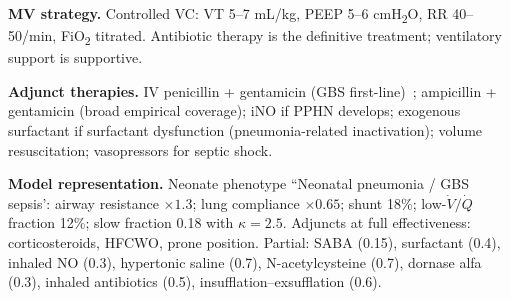 \textbf{MV strategy.} Controlled VC: VT 5--7 mL/kg, PEEP 5--6 cmH\textsubscript{2}O, RR 40--50/min, FiO\textsubscript{2} titrated. Antibiotic therapy is the definitive treatment; ventilatory support is supportive.

\textbf{Adjunct therapies.} IV penicillin + gentamicin (GBS first-line)~\citep{stoll2011}; ampicillin + gentamicin (broad empirical coverage); iNO if PPHN develops; exogenous surfactant if surfactant dysfunction (pneumonia-related inactivation); volume resuscitation; vasopressors for septic shock.

\textbf{Model representation.} Neonate phenotype ``Neonatal pneumonia / GBS sepsis': airway resistance $\times1.3$; lung compliance $\times0.65$; shunt 18\%; low-$\dot V/\dot Q$ fraction 12\%; slow fraction 0.18 with $\kappa=2.5$. Adjuncts at full effectiveness: corticosteroids, HFCWO, prone position. Partial: SABA (0.15), surfactant (0.4), inhaled NO (0.3), hypertonic saline (0.7), N-acetylcysteine (0.7), dornase alfa (0.3), inhaled antibiotics (0.5), insufflation--exsufflation (0.6).
